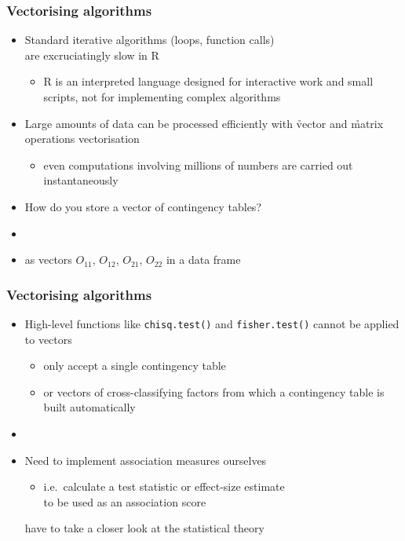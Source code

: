 \documentclass[handout,notes=show,t]{beamer} %
\begin{document}
\begin{frame}
  \frametitle{Vectorising algorithms}

  \begin{itemize}
  \item Standard iterative algorithms (loops, function calls)\\
    are excruciatingly slow in R
    \begin{itemize}
    \item R is an interpreted language designed for interactive work and small
      scripts, not for implementing complex algorithms
    \end{itemize}
  \item Large amounts of data can be processed efficiently with \h{vector} and
    \h{matrix} operations \so vectorisation
    \begin{itemize}
    \item even computations involving millions of numbers are carried out
      instantaneously
    \end{itemize}
  \item How do you store a vector of contingency tables?
  \item[]\pause
  \item[\hand] as vectors $O_{11}$, $O_{12}$, $O_{21}$, $O_{22}$ in a data frame
  \end{itemize}
\end{frame}

\begin{frame}
  \frametitle{Vectorising algorithms}

  \begin{itemize}
  \item High-level functions like \texttt{chisq.test()} and
    \texttt{fisher.test()} cannot be applied to vectors
    \begin{itemize}
    \item only accept a single contingency table
    \item or vectors of cross-classifying factors from which a contingency
      table is built automatically
    \end{itemize}
  \item[]\pause
  \item Need to implement association measures ourselves
    \begin{itemize}
    \item i.e.\ calculate a test statistic or effect-size estimate\\
      to be used as an association score
    \end{itemize}
    \so have to take a closer look at the statistical theory 
  \end{itemize}
\end{frame}
\end{document}

